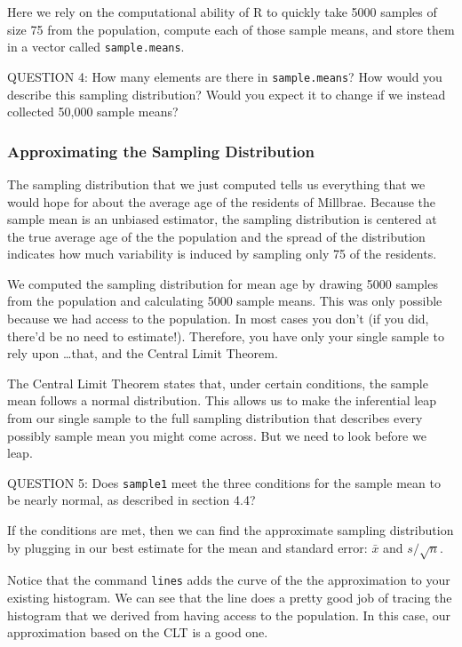 \documentclass[11pt]{article}
\begin{document}
Here we rely on the computational ability of R to quickly take 5000 samples of size 75 from the population, compute each of those sample means, and store them in a vector called \texttt{sample.means}.

\bigskip
QUESTION 4: How many elements are there in \texttt{sample.means}?  How would you describe this sampling distribution?  Would you expect it to change if we instead collected 50,000 sample means?

\subsubsection*{Approximating the Sampling Distribution}
The sampling distribution that we just computed tells us everything that we would hope for about the average age of the residents of Millbrae.  Because the sample mean is an unbiased estimator, the sampling distribution is centered at the true average age of the the population and the spread of the distribution indicates how much variability is induced by sampling only 75 of the residents.

We computed the sampling distribution for mean age by drawing 5000 samples from the population and calculating 5000 sample means.  This was only possible because we had access to the population.  In most cases you don't (if you did, there'd be no need to estimate!).  Therefore, you have only your single sample to rely upon \ldots that, and the Central Limit Theorem.

The Central Limit Theorem states that, under certain conditions, the sample mean follows a normal distribution.  This allows us to make the inferential leap from our single sample to the full sampling distribution that describes every possibly sample mean you might come across.  But we need to look before we leap.

\bigskip
QUESTION 5: Does \texttt{sample1} meet the three conditions for the sample mean to be nearly normal, as described in section 4.4?
\bigskip

If the conditions are met, then we can find the approximate sampling distribution by plugging in our best estimate for the mean and standard error: $\bar{x}$ and $s/\sqrt{n}$.  


Notice that the command \texttt{lines} adds the curve of the the approximation to your existing histogram.  We can see that the line does a pretty good job of tracing the histogram that we derived from having access to the population.  In this case, our approximation based on the CLT is a good one.
\end{document}
